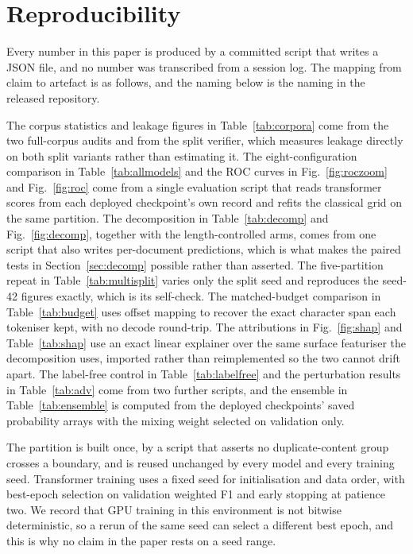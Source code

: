 \section{Reproducibility}
\label{sec:repro}

Every number in this paper is produced by a committed script that writes a JSON file, and no number was transcribed from a session log. The mapping from claim to artefact is as follows, and the naming below is the naming in the released repository.

The corpus statistics and leakage figures in Table~\ref{tab:corpora} come from the two full-corpus audits and from the split verifier, which measures leakage directly on both split variants rather than estimating it. The eight-configuration comparison in Table~\ref{tab:allmodels} and the ROC curves in Fig.~\ref{fig:roczoom} and Fig.~\ref{fig:roc} come from a single evaluation script that reads transformer scores from each deployed checkpoint's own record and refits the classical grid on the same partition. The decomposition in Table~\ref{tab:decomp} and Fig.~\ref{fig:decomp}, together with the length-controlled arms, comes from one script that also writes per-document predictions, which is what makes the paired tests in Section~\ref{sec:decomp} possible rather than asserted. The five-partition repeat in Table~\ref{tab:multisplit} varies only the split seed and reproduces the seed-42 figures exactly, which is its self-check. The matched-budget comparison in Table~\ref{tab:budget} uses offset mapping to recover the exact character span each tokeniser kept, with no decode round-trip. The attributions in Fig.~\ref{fig:shap} and Table~\ref{tab:shap} use an exact linear explainer over the same surface featuriser the decomposition uses, imported rather than reimplemented so the two cannot drift apart. The label-free control in Table~\ref{tab:labelfree} and the perturbation results in Table~\ref{tab:adv} come from two further scripts, and the ensemble in Table~\ref{tab:ensemble} is computed from the deployed checkpoints' saved probability arrays with the mixing weight selected on validation only.

The partition is built once, by a script that asserts no duplicate-content group crosses a boundary, and is reused unchanged by every model and every training seed. Transformer training uses a fixed seed for initialisation and data order, with best-epoch selection on validation weighted F1 and early stopping at patience two. We record that GPU training in this environment is not bitwise deterministic, so a rerun of the same seed can select a different best epoch, and this is why no claim in the paper rests on a seed range.

